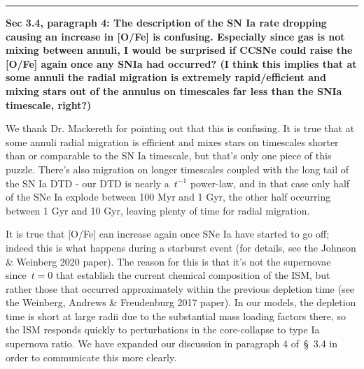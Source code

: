 \documentclass{report}
\newcommand{\breakline}{\noindent\rule{\textwidth}{1pt}}
\begin{document}
\par\null\par 
\breakline 
\par\null\par 
\textbf{ 
	Sec 3.4, paragraph 4: The description of the SN Ia rate dropping causing an 
	increase in [O/Fe] is confusing. 
	Especially since gas is not mixing between annuli, I would be surprised if 
	CCSNe could raise the [O/Fe] again once any SNIa had occurred? 
	(I think this implies that at some annuli the radial migration is extremely 
	rapid/efficient and mixing stars out of the annulus on timescales far less 
	than the SNIa timescale, right?) 
} 
\par 
We thank Dr. Mackereth for pointing out that this is confusing. 
It is true that at some annuli radial migration is efficient and mixes stars 
on timescales shorter than or comparable to the SN Ia timescale, but that's 
only one piece of this puzzle. 
There's also migration on longer timescales coupled with the long tail of the 
SN Ia DTD - our DTD is nearly a~$t^{-1}$ power-law, and in that case only half 
of the SNe Ia explode between 100 Myr and 1 Gyr, the other half occurring 
between 1 Gyr and 10 Gyr, leaving plenty of time for radial migration. 
\par 
It is true that [O/Fe] can increase again once SNe Ia have started to go 
off; indeed this is what happens during a starburst event (for details, see the 
Johnson \& Weinberg 2020 paper). 
The reason for this is that it's not the supernovae since~$t = 0$ that 
establish the current chemical composition of the ISM, but rather those that 
occurred approximately within the previous depletion time (see the Weinberg, 
Andrews \& Freudenburg 2017 paper). 
In our models, the depletion time is short at large radii due to the 
substantial mass loading factors there, so the ISM responds quickly to 
perturbations in the core-collapse to type Ia supernova ratio. 
We have expanded our discussion in paragraph 4 of~\S~3.4 in order to 
communicate this more clearly. 
\end{document}

